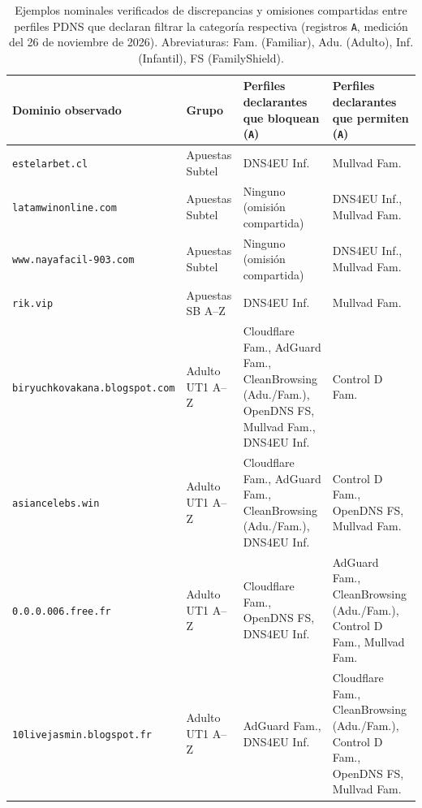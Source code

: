 \documentclass[10pt,a4paper]{article}
\begin{document}
\begin{table}[H]
\centering\scriptsize
\caption{Ejemplos nominales verificados de discrepancias y omisiones compartidas entre perfiles PDNS que declaran filtrar la categoría respectiva (registros \texttt{A}, medición del 26 de noviembre de 2026). Abreviaturas: Fam. (Familiar), Adu. (Adulto), Inf. (Infantil), FS (FamilyShield).}
\label{tab:discrepancias}
\begin{tabularx}{\textwidth}{>{\raggedright\arraybackslash}p{4.05cm}>{\raggedright\arraybackslash}p{2.20cm}>{\raggedright\arraybackslash}p{4.15cm}Y}
\toprule
Dominio observado & Grupo & Perfiles declarantes que bloquean (\texttt{A}) & Perfiles declarantes que permiten (\texttt{A})\\
\midrule
\texttt{estelarbet.cl} & Apuestas Subtel & DNS4EU Inf. & Mullvad Fam.\\
\texttt{latamwinonline.com} & Apuestas Subtel & Ninguno (omisión compartida) & DNS4EU Inf., Mullvad Fam.\\
\texttt{www.nayafacil-903.com} & Apuestas Subtel & Ninguno (omisión compartida) & DNS4EU Inf., Mullvad Fam.\\
\texttt{rik.vip} & Apuestas SB A--Z & DNS4EU Inf. & Mullvad Fam.\\
\texttt{biryuchkovakana.blogspot.com} & Adulto UT1 A--Z & Cloudflare Fam., AdGuard Fam., CleanBrowsing (Adu./Fam.), OpenDNS FS, Mullvad Fam., DNS4EU Inf. & Control D Fam.\\
\texttt{asiancelebs.win} & Adulto UT1 A--Z & Cloudflare Fam., AdGuard Fam., CleanBrowsing (Adu./Fam.), DNS4EU Inf. & Control D Fam., OpenDNS FS, Mullvad Fam.\\
\texttt{0.0.0.006.free.fr} & Adulto UT1 A--Z & Cloudflare Fam., OpenDNS FS, DNS4EU Inf. & AdGuard Fam., CleanBrowsing (Adu./Fam.), Control D Fam., Mullvad Fam.\\
\texttt{10livejasmin.blogspot.fr} & Adulto UT1 A--Z & AdGuard Fam., DNS4EU Inf. & Cloudflare Fam., CleanBrowsing (Adu./Fam.), Control D Fam., OpenDNS FS, Mullvad Fam.\\
\bottomrule
\end{tabularx}
\end{table}
\end{document}
